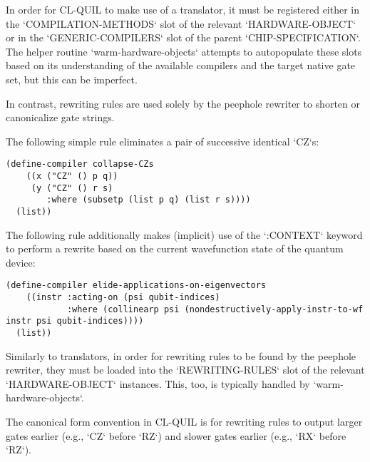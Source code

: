 In order for CL-QUIL to make use of a translator, it must be registered either in the `COMPILATION-METHODS` slot of the relevant `HARDWARE-OBJECT` or in the `GENERIC-COMPILERS` slot of the parent `CHIP-SPECIFICATION`.  The helper routine `warm-hardware-objects` attempts to autopopulate these slots based on its understanding of the available compilers and the target native gate set, but this can be imperfect.

In contrast, rewriting rules are used solely by the peephole rewriter to shorten or canonicalize gate strings.

\begin{example}
The following simple rule eliminates a pair of successive identical `CZ`s:
\begin{verbatim}
(define-compiler collapse-CZs
    ((x ("CZ" () p q))
     (y ("CZ" () r s)
        :where (subsetp (list p q) (list r s))))
  (list))
\end{verbatim}
\end{example}

\begin{example}
The following rule additionally makes (implicit) use of the `:CONTEXT` keyword to perform a rewrite based on the current wavefunction state of the quantum device:
\begin{verbatim}
(define-compiler elide-applications-on-eigenvectors
    ((instr :acting-on (psi qubit-indices)
            :where (collinearp psi (nondestructively-apply-instr-to-wf instr psi qubit-indices))))
  (list))
\end{verbatim}
\end{example}

Similarly to translators, in order for rewriting rules to be found by the peephole rewriter, they must be loaded into the `REWRITING-RULES` slot of the relevant `HARDWARE-OBJECT` instances.  This, too, is typically handled by `warm-hardware-objects`.

\begin{remark}
The canonical form convention in CL-QUIL is for rewriting rules to output larger gates earlier (e.g., `CZ` before `RZ`) and slower gates earlier (e.g., `RX` before `RZ`).
\end{remark}
